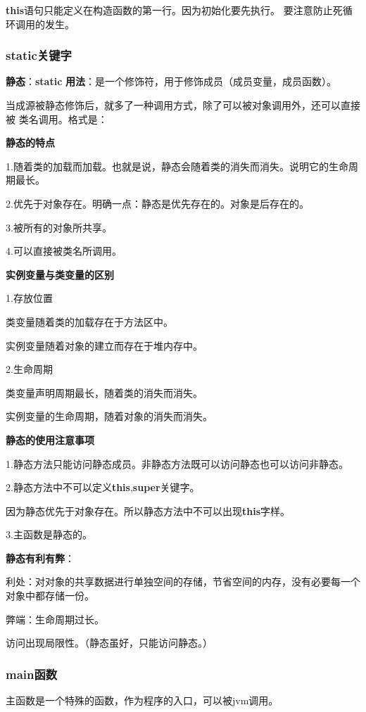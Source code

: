 \documentclass[UTF8]{ctexart}
\begin{document}
\textbf{this}语句只能定义在构造函数的第一行。因为初始化要先执行。
要注意防止死循环调用的发生。

\subsubsection{static关键字}
\textbf{静态}：\textbf{static}
\textbf{用法}：是一个修饰符，用于修饰成员（成员变量，成员函数）。

当成源被静态修饰后，就多了一种调用方式，除了可以被对象调用外，还可以直接被
类名调用。格式是：

\textbf{静态的特点}

1.随着类的加载而加载。也就是说，静态会随着类的消失而消失。说明它的生命周期最长。

2.优先于对象存在。明确一点：静态是优先存在的。对象是后存在的。

3.被所有的对象所共享。

4.可以直接被类名所调用。

\textbf{实例变量与类变量的区别}

1.存放位置
	
	类变量随着类的加载存在于方法区中。

	实例变量随着对象的建立而存在于堆内存中。

2.生命周期
	
	类变量声明周期最长，随着类的消失而消失。

	实例变量的生命周期，随着对象的消失而消失。

\textbf{静态的使用注意事项}

1.静态方法只能访问静态成员。非静态方法既可以访问静态也可以访问非静态。

2.静态方法中不可以定义\textbf{this},\textbf{super}关键字。
	
	因为静态优先于对象存在。所以静态方法中不可以出现\textbf{this}字样。

3.主函数是静态的。

\textbf{静态有利有弊}：

利处：对对象的共享数据进行单独空间的存储，节省空间的内存，没有必要每一个对象中都存储一份。

弊端：生命周期过长。

	  访问出现局限性。（静态虽好，只能访问静态。）




\subsubsection{main函数}
主函数是一个特殊的函数，作为程序的入口，可以被jvm调用。
\end{document}
